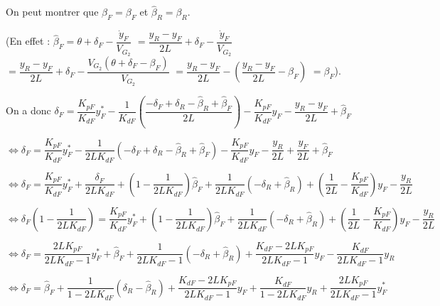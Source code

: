 \documentclass[11pt]{article}
\begin{document}
\begin{UPSTIcorrige}
On peut montrer que  $\hat{\beta}_F= {\beta}_F$ et $\hat{\beta}_R= {\beta}_R$.

(En effet : $\hat{\beta}_F = \theta + \delta_F -\dfrac{\dot{y}_F}{V_{G_2}}$ 
$=\dfrac{y_R-y_F}{2L}+ \delta_F -\dfrac{\dot{y}_F}{V_{G_2}}$
$=\dfrac{y_R-y_F}{2L}+ \delta_F -\dfrac{V_{G_2}\left( \theta+\delta_F-\beta_F\right)}{V_{G_2}}$
$=\dfrac{y_R-y_F}{2L} -\left( \dfrac{y_R-y_F}{2L}-\beta_F\right)$ $=\beta_F$).


On a donc 
$\delta_F  = \dfrac{K_{pF}}{K_{dF}}y_F^* - \dfrac{1}{K_{dF}}\left(  \dfrac{ -\delta_F+ \delta_R -\hat{\beta}_R+\hat{\beta}_F}{2L} \right) - \dfrac{K_{pF}}{K_{dF}}y_F-   \dfrac{y_R-y_F}{2L} +\hat{\beta}_F $


$\Leftrightarrow \delta_F  = \dfrac{K_{pF}}{K_{dF}}y_F^* - \dfrac{1}{2L K_{dF}}\left(  - \delta_F+ \delta_R -\hat{\beta}_R+\hat{\beta}_F \right) - \dfrac{K_{pF}}{K_{dF}}y_F   -   \dfrac{y_R}{2L}+   \dfrac{y_F}{2L} +\hat{\beta}_F $



$\Leftrightarrow \delta_F  = \dfrac{K_{pF}}{K_{dF}}y_F^* 
+\dfrac{ \delta_F}{2L K_{dF}}
+  \left(1-\dfrac{1}{2L K_{dF}}\right)\hat{\beta}_F
+\dfrac{1}{2L K_{dF}}\left(   -\delta_R +\hat{\beta}_R \right)  
+\left( \dfrac{1}{2L}  - \dfrac{K_{pF}}{K_{dF}}\right)y_F 
- \dfrac{y_R}{2L} $

$\Leftrightarrow \delta_F  \left(1- \dfrac{ 1}{2L K_{dF}}\right)= \dfrac{K_{pF}}{K_{dF}}y_F^* 
+  \left(1-\dfrac{1}{2L K_{dF}}\right)\hat{\beta}_F
+\dfrac{1}{2L K_{dF}}\left(  - \delta_R +\hat{\beta}_R \right)  
+\left( \dfrac{1}{2L}  - \dfrac{K_{pF}}{K_{dF}}\right)y_F 
- \dfrac{y_R}{2L} $


$\Leftrightarrow \delta_F  = \dfrac{2L K_{pF}}{ 2L K_{dF}-1}y_F^* 
+ \hat{\beta}_F
+\dfrac{1}{ 2L K_{dF}-1}\left(  - \delta_R +\hat{\beta}_R \right)  
+ \dfrac{K_{dF}- 2L K_{pF}}{ 2L K_{dF}-1}y_F 
- \dfrac{ K_{dF}}{ 2L K_{dF}-1} {y_R}$

$\Leftrightarrow \delta_F  = 
\hat{\beta}_F
+\dfrac{1}{1- 2L K_{dF}}\left(  \delta_R -\hat{\beta}_R \right)  
+ \dfrac{K_{dF}- 2L K_{pF}}{ 2L K_{dF}-1}y_F 
+ \dfrac{ K_{dF}}{1- 2L K_{dF}} {y_R}
+\dfrac{2L K_{pF}}{ 2L K_{dF}-1}y_F^* $



\end{UPSTIcorrige}
\end{document}
